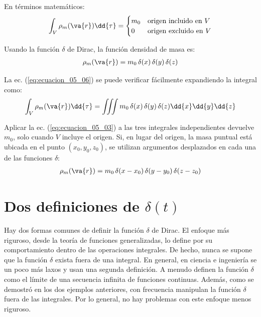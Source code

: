 En términos matemáticos:
\begin{align}
\int_{V} \rho_{m} (\va{r}) \dd{\tau} = \begin{cases}
m_{0} & \mbox{origen incluido en } V \\
0 & \mbox{origen excluido en } V
\end{cases}
\label{eq:ecuacion_05_06}
\end{align}

Usando la función $\delta$ de Dirac, la función densidad de masa es:
\begin{align}
\rho_{m} (\va{r}) = m_{0} \, \delta(x) \, \delta(y) \, \delta(z)
\label{eq:ecuacion_05_07}
\end{align}

La ec. (\ref{eq:ecuacion_05_06}) se puede verificar fácilmente expandiendo la integral como:
\begin{align}
\int_{V} \rho_{m} (\va{r}) \dd{\tau} = \iiint m_{0} \, \delta(x) \, \delta(y) \, \delta(z) \dd{x} \dd{y} \dd{z}
\label{eq:ecuacion_05_08}
\end{align}

Aplicar la ec. (\ref{eq:ecuacion_05_03}) a las tres integrales independientes devuelve $m_{0}$, solo cuando $V$ incluye el origen. Si, en lugar del origen, la masa puntual está ubicada en el punto $(x_{0}, y_{0}, z_{0})$, se utilizan argumentos desplazados en cada una de las funciones $\delta$:
\begin{align}
\rho_{m} (\va{r}) = m_{0} \, \delta (x - x_{0}) \, \delta (y - y_{0}) \, \delta (z - z_{0})
\label{eq:ecuacion_05_09}
\end{align}

\section{Dos definiciones de \texorpdfstring{$\delta (t)$}{d(t)}}

Hay dos formas comunes de definir la función $\delta$ de Dirac. El enfoque más riguroso, desde la teoría de funciones generalizadas, lo define por su comportamiento dentro de las operaciones integrales. De hecho, nunca se supone que la función $\delta$ exista fuera de una integral. En general, en ciencia e ingeniería se un poco más laxos y usan una segunda definición. A menudo definen la función $\delta$ como el límite de una secuencia infinita de funciones continuas. Además, como se demostró en los dos ejemplos anteriores, con frecuencia manipulan la función $\delta$ fuera de las integrales. Por lo general, no hay problemas con este enfoque menos riguroso.

